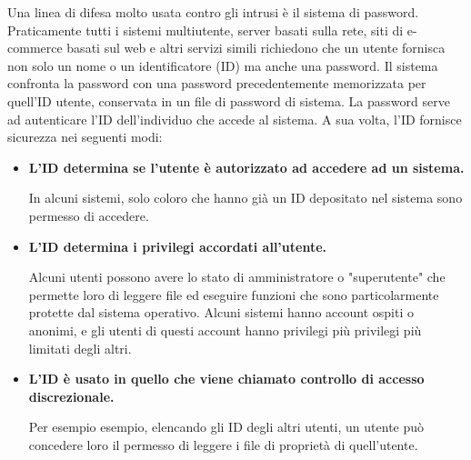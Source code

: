 Una linea di difesa molto usata contro gli intrusi è il sistema di password. Praticamente tutti i sistemi multiutente, server basati sulla rete, siti di e-commerce basati sul web e altri servizi simili richiedono che un utente fornisca non solo un nome o un identificatore (ID) ma anche una password. Il sistema confronta la password con una password precedentemente memorizzata per quell'ID utente, conservata in un file di password di sistema. La password serve ad autenticare l'ID dell'individuo che accede al sistema. A sua volta, l'ID fornisce sicurezza nei seguenti modi:
\begin{itemize}
    \item \textbf{L'ID determina se l'utente è autorizzato ad accedere ad un sistema.}
    
    In alcuni sistemi, solo coloro che hanno già un ID depositato nel sistema sono permesso di accedere.
    
    \item \textbf{L'ID determina i privilegi accordati all'utente.}
    
    Alcuni utenti possono avere lo stato di amministratore o "superutente" che permette loro di leggere file ed eseguire funzioni che sono particolarmente protette dal sistema operativo. Alcuni sistemi hanno account ospiti o anonimi, e gli utenti di questi account hanno privilegi più privilegi più limitati degli altri.
    
    \item \textbf{L'ID è usato in quello che viene chiamato controllo di accesso discrezionale.}
    
    Per esempio esempio, elencando gli ID degli altri utenti, un utente può concedere loro il permesso di leggere i file di proprietà di quell'utente.
\end{itemize}
\newpage
